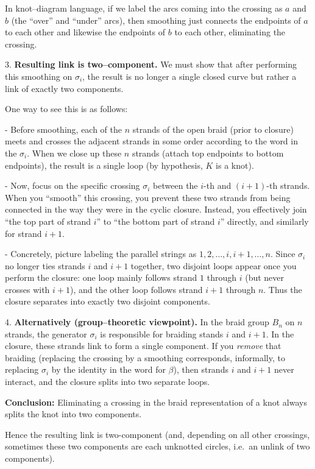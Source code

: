 \documentclass[12p]{article}
\newcounter{answercounter}
\newenvironment{answer}[1][]
{\refstepcounter{answercounter}%
\begin{tcolorbox}[
    title=Answer \theanswercounter: #1,
    colback=white, %
    colframe=gray,
    coltext=black, %
    fonttitle=\bfseries\normalsize,
    top=2mm,
    bottom=2mm,
    enlarge top initially by=5mm
]
\small
}
{\end{tcolorbox}}
\begin{document}
\begin{answer}[by openai/o1 (generated in 0 minutes and 15 seconds.)]
   In knot–diagram language, if we label the arcs coming into the crossing as \(a\) and \(b\) (the “over” and “under” arcs), then smoothing just connects the endpoints of \(a\) to each other and likewise the endpoints of \(b\) to each other, eliminating the crossing.

3. \textbf{Resulting link is two–component.}
   We must show that after performing this smoothing on \(\sigma_i\), the result is no longer a single closed curve but rather a link of exactly two components.

   One way to see this is as follows:

   - Before smoothing, each of the \(n\) strands of the open braid (prior to closure) meets and crosses the adjacent strands in some order according to the word in the \(\sigma_i\).  When we close up these \(n\) strands (attach top endpoints to bottom endpoints), the result is a single loop (by hypothesis, \(K\) is a knot).

   - Now, focus on the specific crossing \(\sigma_i\) between the \(i\)-th and \((i+1)\)-th strands.  When you “smooth” this crossing, you prevent these two strands from being connected in the way they were in the cyclic closure.  Instead, you effectively join “the top part of strand \(i\)” to “the bottom part of strand \(i\)” directly, and similarly for strand \(i+1\). 

   - Concretely, picture labeling the parallel strings as \(1,2,\dots,i,i+1,\dots,n\).  Since \(\sigma_i\) no longer ties strands \(i\) and \(i+1\) together, two disjoint loops appear once you perform the closure: one loop mainly follows strand \(1\) through \(i\) (but never crosses with \(i+1\)), and the other loop follows strand \(i+1\) through \(n\).  Thus the closure separates into exactly two disjoint components.

4. \textbf{Alternatively (group–theoretic viewpoint).}
   In the braid group \(B_n\) on \(n\) strands, the generator \(\sigma_i\) is responsible for braiding stands \(i\) and \(i+1\).  In the closure, these strands link to form a single component.  If you \emph{remove} that braiding (replacing the crossing by a smoothing corresponds, informally, to replacing \(\sigma_i\) by the identity in the word for \(\beta\)), then strands \(i\) and \(i+1\) never interact, and the closure splits into two separate loops.  


\textbf{Conclusion:}\quad
Eliminating a crossing in the braid representation of a knot always splits the knot into two components.

Hence the resulting link is two-component (and, depending on all other crossings, sometimes these two components are each unknotted circles, i.e.\ an unlink of two components).
\end{answer}
\end{document}
